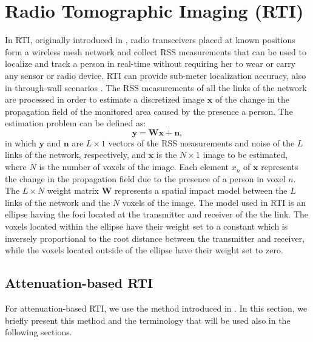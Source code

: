 \documentclass[conference]{IEEEtran}
\begin{document}
\section{Radio Tomographic Imaging (RTI)} \label{sec:rti}

In RTI, originally introduced in \cite{Wilson_RTI_2010}, radio
transceivers placed at known positions form a wireless mesh network
and collect RSS measurements that can be used to localize and track a
person in real-time without requiring her to wear or carry any sensor
or radio device. RTI can provide sub-meter localization accuracy, also
in through-wall scenarios
\cite{Wilson_VRTI_2011,MASS,Grandma_2012}. The RSS measurements of all
the links of the network are processed in order to estimate a
discretized image $\mathbf{x}$ of the change in the propagation field
of the monitored area caused by the presence a person. The estimation
problem can be defined as:
\begin{equation} \label{RTI_linear_eq}
\mathbf{y} = \mathbf{W}\mathbf{x} + \mathbf{n},
\end{equation}
in which $\mathbf{y}$ and $\mathbf{n}$ are $L \times 1$ vectors of the
RSS measurements and noise of the $L$ links of the network,
respectively, and $\mathbf{x}$ is the $N \times 1$ image to be
estimated, where $N$ is the number of voxels of the image. Each
element $x_n$ of $\mathbf{x}$ represents the change in the propagation
field due to the presence of a person in voxel $n$. The $L \times N$
weight matrix $\mathbf{W}$ represents a spatial impact model between
the $L$ links of the network and the $N$ voxels of the image. The
model used in RTI
\cite{Wilson_VRTI_2011,Wilson_RTI_2010,Patwari_corr_shadow_2008,MASS}
is an ellipse having the foci located at the transmitter and receiver
of the the link. The voxels located within the ellipse have their
weight set to a constant which is inversely proportional to the root
distance between the transmitter and receiver, while the voxels
located outside of the ellipse have their weight set to zero.



\subsection{Attenuation-based RTI} \label{sec:attenuation_based_RTI}

For attenuation-based RTI, we use the method introduced in
\cite{MASS}. In this section, we briefly present this method and the
terminology that will be used also in the following sections.
\end{document}
